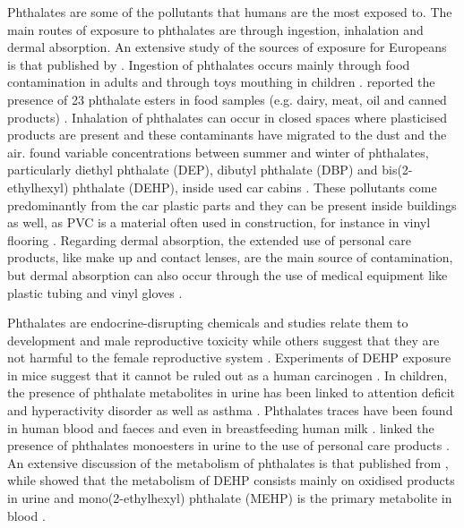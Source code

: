 Phthalates are some of the pollutants that humans are the most exposed to.
%
The main routes of exposure to phthalates are through ingestion, inhalation and dermal absorption.
%
An extensive study of the  sources of exposure  for Europeans is that published by  \citeauthor{wormuth2006sources} \cite{wormuth2006sources}.
%
Ingestion of phthalates occurs mainly through food contamination in adults and through toys mouthing in children \cite{fan2012determination,earls2003gas}. 
%
 \citeauthor{xu2014determination} reported the presence of 23 phthalate esters in food samples (e.g. dairy, meat, oil and canned products) 
\cite{xu2014determination}.
%
Inhalation of phthalates  can occur in closed spaces where plasticised products are present and these contaminants  have migrated to the dust and the air.
%
\citeauthor{geiss2009investigation} found  variable concentrations between summer and winter of phthalates, particularly diethyl phthalate (DEP), dibutyl phthalate (DBP) and bis(2-ethylhexyl) phthalate (DEHP), inside used car cabins \cite{geiss2009investigation}.
%
These pollutants come predominantly from the car plastic parts and they can be present inside buildings as well, as PVC is a material often used in construction, for instance in vinyl flooring  \cite{gong2018letter}.
%
%
Regarding dermal absorption, the extended use of personal care products, like make up and contact lenses, are the main source of contamination, but dermal absorption can also occur through the use of medical equipment like plastic tubing and vinyl gloves \cite{perez2011presence,duty2005personal,calafat2004exposure}.



Phthalates are  %
endocrine-disrupting chemicals  %
and studies relate them to development and male reproductive toxicity while others suggest that they are not harmful to the female reproductive system \cite{rudel2003phthalates,foster2000effects,benson2009hazard,matsumoto2008potential,kay2013reproductive}. 
%
Experiments of  DEHP exposure  in mice suggest that it cannot be ruled out as a human carcinogen \cite{rusyn2012mechanistic}.
%
In children, the presence of phthalate metabolites in urine has been linked to attention deficit and hyperactivity disorder as well as  asthma \cite{kim2009phthalates,bornehag2010phthalate}.
%
Phthalates traces have been found in human blood and faeces and even in breastfeeding human milk \cite{de2014review,zhu2006phthalate}.
%
\citeauthor{duty2005personal} linked the presence of phthalates monoesters in urine to the use of personal care products \cite{duty2005personal}.
%
An extensive discussion of the metabolism of phthalates is that published from \citeauthor{frederiksen2007metabolism}, %
while  
\citeauthor{wittassek2008phthalates} showed that the metabolism of DEHP consists mainly on oxidised products in urine and mono(2-ethylhexyl) phthalate (MEHP) is the primary metabolite in blood 
\cite{frederiksen2007metabolism,wittassek2008phthalates}.
%


